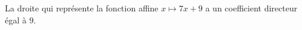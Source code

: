 La droite qui représente la fonction affine $x\mapsto 7x+9$ a un coefficient directeur égal à $9$.

\begin{reponses}
\end{reponses}

\begin{comment}

\end{comment}

